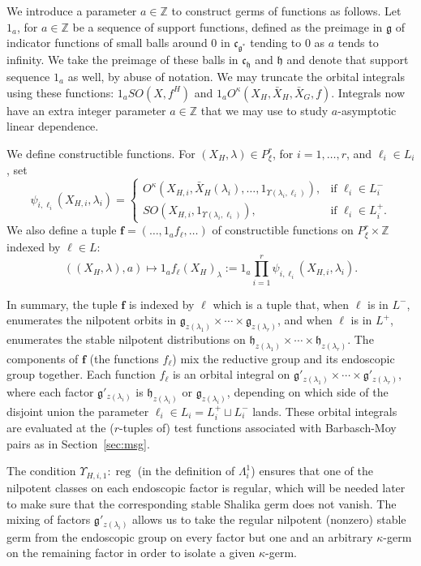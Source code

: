 \documentclass[12pt]{amsart}
\newcommand{\op}[1]{\operatorname{#1}}
\newcommand{\ring}[1]{{\mathbb #1}}
\def\Y{\Upsilon}
\def\bf{\mathbf f}
\newcommand{\fg}{\mathfrak{g}}
\newcommand{\fc}{\mathfrak{c}}
\newcommand{\fh}{\mathfrak{h}}
\theoremstyle{plain}
\theoremstyle{definition}
\begin{document}
We introduce a parameter $a\in\ring{Z}$ to construct germs of
functions as follows.  Let $1_a$, for $a\in\ring{Z}$ be a sequence of
support functions, defined as the preimage in $\fg$ of indicator
functions of small balls around $0$ in $\fc_{\fg^*}$ tending to $0$ as
$a$ tends to infinity.  We take the preimage of these balls in
$\fc_{\fh}$ and $\fh$ and denote that support sequence $1_a$ as well,
by abuse of notation.  We may truncate the orbital integrals using
these functions: $1_a SO(X,f^H)$ and $1_a O^\kappa(X_H,\bar
X_H,\bar X_G,f)$.  Integrals now have an extra integer parameter
$a\in\ring{Z}$ that we may use to study $a$-asymptotic linear
dependence.  

We define constructible functions.  For $(X_H,\lambda)\in
P^r_\xi$,  for $i=1,\ldots,r$, and $\ell_i\in L_i$,
set
\begin{equation}\label{eqn:psi}
\psi_{i,\ell_i}(X_{H,i},\lambda_i) = 
\begin{cases}   
  O^\kappa(X_{H,i},\bar X_H(\lambda_i),\ldots,1_{\Y(\lambda_i,\ell_i)}),
   & \text{if } \ell_i\in L^-_i \\
  SO(X_{H,i},1_{\Y(\lambda_i,\ell_i)}),
   & \text{if } \ell_i\in L^+_i.
\end{cases}
\end{equation}
We also define a tuple $\bf=(\ldots,1_a f_\ell,\ldots)$ of constructible
functions on $P^r_\xi\times\ring{Z}$ indexed by $\ell\in L$:
\[
((X_H,\lambda),a)\mapsto 1_a f_\ell(X_H)_\lambda 
:= 1_a \prod_{i=1}^r \psi_{i,\ell_i}(X_{H,i},\lambda_i).
\]


In summary, the tuple $\bf$ is indexed by $\ell$ which is a tuple
that, when $\ell$ is in $L^-$, enumerates the nilpotent orbits in
$\fg_{z(\lambda_1)}\times \cdots\times \fg_{z(\lambda_r)}$, and when
$\ell$ is in $L^+$, enumerates the stable nilpotent distributions on
$\fh_{z(\lambda_1)}\times \cdots\times \fh_{z(\lambda_r)}$.  The
components of $\bf$ (the functions $f_\ell$) mix the reductive group
and its endoscopic group together.  Each function $f_\ell$ is an
orbital integral on $\fg'_{z(\lambda_1)}\times \cdots\times
\fg'_{z(\lambda_r)}$, where each factor $\fg'_{z(\lambda_i)}$ is
$\fh_{z(\lambda_i)}$ or $\fg_{z(\lambda_i)}$, depending on which side
of the disjoint union the parameter $\ell_i\in L_i = L^+_i\sqcup
L^-_i$ lands.  These orbital integrals are evaluated at the
($r$-tuples of) test functions associated with Barbasch-Moy pairs as
in Section~\ref{sec:msg}. 

The condition $\Upsilon_{H,i,1}:\op{reg}$ (in the
definition of $\Lambda^1_i$) ensures that one of the nilpotent classes
on each endoscopic factor is regular, which will be needed later to
make sure that the corresponding stable Shalika germ does not vanish.
The mixing of factors $\fg'_{z(\lambda_i)}$ allows us to take the
regular nilpotent (nonzero) stable germ from the endoscopic group on every factor
but one and an arbitrary $\kappa$-germ on the remaining factor in
order to isolate a given $\kappa$-germ.
\end{document}
